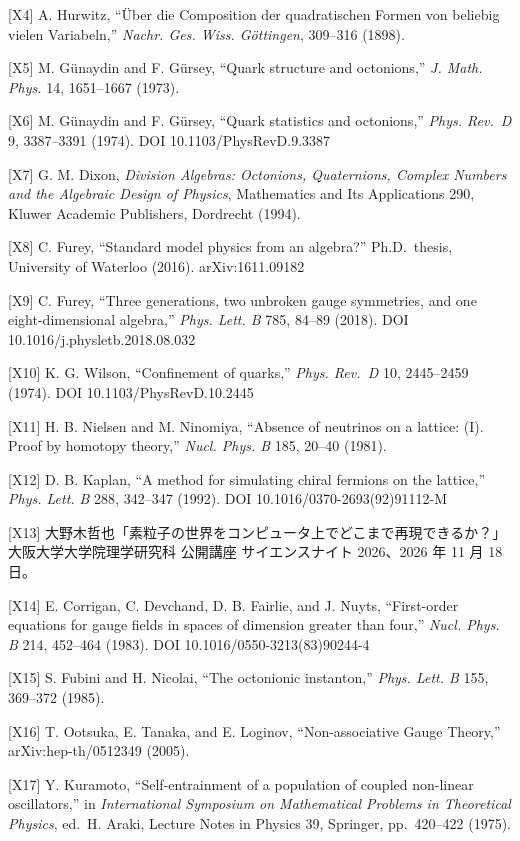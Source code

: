 \documentclass[
  a4paper,
]{ltjsarticle}
\begin{document}
{[}X4{]} A. Hurwitz, ``Über die Composition der quadratischen Formen von
beliebig vielen Variabeln,'' \emph{Nachr. Ges. Wiss. Göttingen},
309--316 (1898).

{[}X5{]} M. Günaydin and F. Gürsey, ``Quark structure and octonions,''
\emph{J. Math. Phys.} 14, 1651--1667 (1973).

{[}X6{]} M. Günaydin and F. Gürsey, ``Quark statistics and octonions,''
\emph{Phys. Rev.~D} 9, 3387--3391 (1974). DOI 10.1103/PhysRevD.9.3387

{[}X7{]} G. M. Dixon, \emph{Division Algebras: Octonions, Quaternions,
Complex Numbers and the Algebraic Design of Physics}, Mathematics and
Its Applications 290, Kluwer Academic Publishers, Dordrecht (1994).

{[}X8{]} C. Furey, ``Standard model physics from an algebra?''
Ph.D.~thesis, University of Waterloo (2016). arXiv:1611.09182

{[}X9{]} C. Furey, ``Three generations, two unbroken gauge symmetries,
and one eight-dimensional algebra,'' \emph{Phys. Lett. B} 785, 84--89
(2018). DOI 10.1016/j.physletb.2018.08.032

{[}X10{]} K. G. Wilson, ``Confinement of quarks,'' \emph{Phys. Rev.~D}
10, 2445--2459 (1974). DOI 10.1103/PhysRevD.10.2445

{[}X11{]} H. B. Nielsen and M. Ninomiya, ``Absence of neutrinos on a
lattice: (I). Proof by homotopy theory,'' \emph{Nucl. Phys. B} 185,
20--40 (1981).

{[}X12{]} D. B. Kaplan, ``A method for simulating chiral fermions on the
lattice,'' \emph{Phys. Lett. B} 288, 342--347 (1992). DOI
10.1016/0370-2693(92)91112-M

{[}X13{]}
大野木哲也「素粒子の世界をコンピュータ上でどこまで再現できるか？」大阪大学大学院理学研究科
公開講座 サイエンスナイト 2026、2026 年 11 月 18 日。

{[}X14{]} E. Corrigan, C. Devchand, D. B. Fairlie, and J. Nuyts,
``First-order equations for gauge fields in spaces of dimension greater
than four,'' \emph{Nucl. Phys. B} 214, 452--464 (1983). DOI
10.1016/0550-3213(83)90244-4

{[}X15{]} S. Fubini and H. Nicolai, ``The octonionic instanton,''
\emph{Phys. Lett. B} 155, 369--372 (1985).

{[}X16{]} T. Ootsuka, E. Tanaka, and E. Loginov, ``Non-associative Gauge
Theory,'' arXiv:hep-th/0512349 (2005).

{[}X17{]} Y. Kuramoto, ``Self-entrainment of a population of coupled
non-linear oscillators,'' in \emph{International Symposium on
Mathematical Problems in Theoretical Physics}, ed.~H. Araki, Lecture
Notes in Physics 39, Springer, pp.~420--422 (1975).
\end{document}

